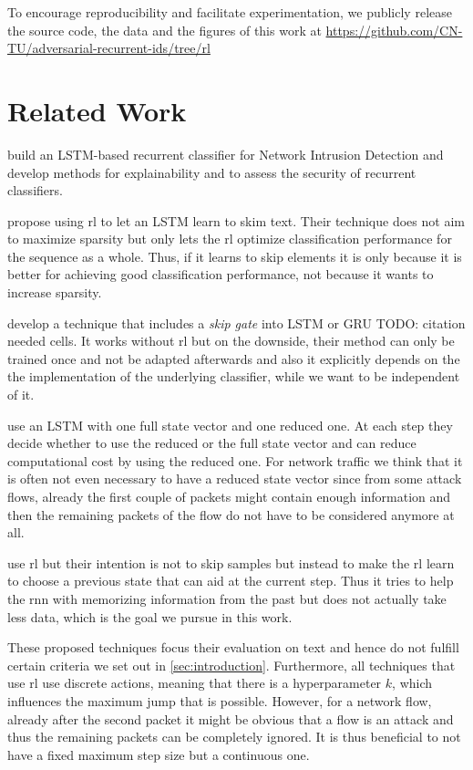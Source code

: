 \documentclass[conference]{IEEEtran}
\newcommand\note[2]{{\color{#1}#2}}
\newcommand\todo[1]{{\note{red}{TODO: #1}}}
\begin{document}
To encourage reproducibility and facilitate experimentation, we publicly release the source code, the data and the figures of this work at \url{https://github.com/CN-TU/adversarial-recurrent-ids/tree/rl}

\section{Related Work}

\cite{hartl_explainability_2019} build an LSTM-based recurrent classifier for Network Intrusion Detection and develop methods for explainability and to assess the security of recurrent classifiers. 

\cite{yu_learning_2017} propose using \gls{rl} to let an LSTM learn to skim text. Their technique does not aim to maximize sparsity but only lets the \gls{rl} optimize classification performance for the sequence as a whole. Thus, if it learns to skip elements it is only because it is better for achieving good classification performance, not because it wants to increase sparsity. 

\cite{campos_skip_2018} develop a technique that includes a \textit{skip gate} into LSTM or GRU \todo{citation needed} cells. It works without \gls{rl} but on the downside, their method can only be trained once and not be adapted afterwards and also it explicitly depends on the the implementation of the underlying classifier, while we want to be independent of it. 

\cite{seo_neural_2018} use an LSTM with one full state vector and one reduced one. At each step they decide whether to use the reduced or the full state vector and can reduce computational cost by using the reduced one. For network traffic we think that it is often not even necessary to have a reduced state vector since from some attack flows, already the first couple of packets might contain enough information and then the remaining packets of the flow do not have to be considered anymore at all. 

\cite{gui_long_2018} use \gls{rl} but their intention is not to skip samples but instead to make the \gls{rl} learn to choose a previous state that can aid at the current step. Thus it tries to help the \gls{rnn} with memorizing information from the past but does not actually take less data, which is the goal we pursue in this work. 

These proposed techniques focus their evaluation on text and hence do not fulfill certain criteria we set out in \autoref{sec:introduction}. Furthermore, all techniques that use \gls{rl} use discrete actions, meaning that there is a hyperparameter $k$, which influences the maximum jump that is possible. However, for a network flow, already after the second packet it might be obvious that a flow is an attack and thus the remaining packets can be completely ignored. It is thus beneficial to not have a fixed maximum step size but a continuous one. 
\end{document}
